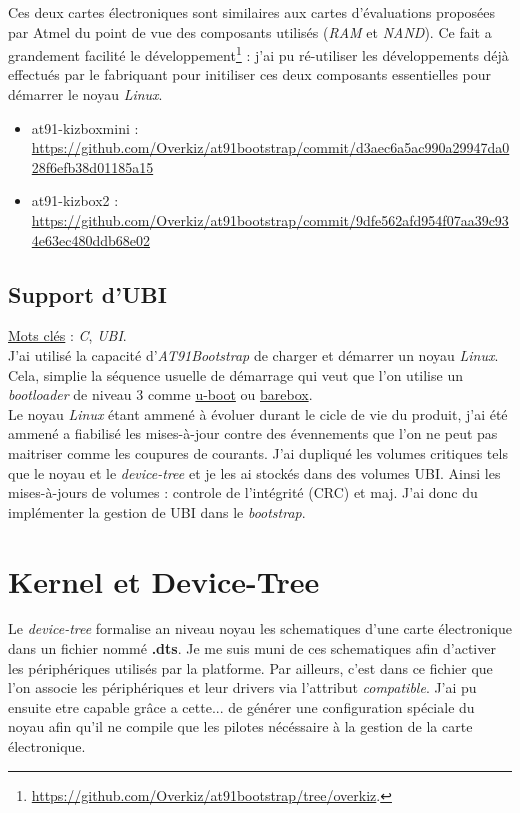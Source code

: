 \documentclass[a4paper]{article}
\begin{document}
Ces deux cartes électroniques sont similaires aux cartes d'évaluations proposées par Atmel du point de vue des composants utilisés (\textit{RAM} et \textit{NAND}). Ce fait a grandement facilité le développement\footnote{\url{https://github.com/Overkiz/at91bootstrap/tree/overkiz}.} : j'ai pu ré-utiliser les développements déjà effectués par le fabriquant pour initiliser ces deux composants essentielles pour démarrer le noyau \textit{Linux}.
\begin{itemize}
\item at91-kizboxmini : \url{https://github.com/Overkiz/at91bootstrap/commit/d3aec6a5ac990a29947da028f6efb38d01185a15}
\item at91-kizbox2 : \url{https://github.com/Overkiz/at91bootstrap/commit/9dfe562afd954f07aa39c934e63ec480ddb68e02}
\end{itemize}

\subsection{Support d'UBI}

\underline{Mots clés} : \textit{C}, \textit{UBI}.\\

J'ai utilisé la capacité d'\textit{AT91Bootstrap} de charger et démarrer un noyau \textit{Linux}. Cela, simplie la séquence usuelle de démarrage qui veut que l'on utilise un \textit{bootloader} de niveau 3 comme \href{http://www.denx.de/wiki/U-Boot}{u-boot} ou \href{http://www.barebox.org/}{barebox}.\\

Le noyau \textit{Linux} étant ammené à évoluer durant le cicle de vie du produit, j'ai été ammené a fiabilisé les mises-à-jour contre des évennements que l'on ne peut pas maitriser comme les coupures de courants. J'ai dupliqué les volumes critiques tels que le noyau et le \textit{device-tree} et je les ai stockés dans des volumes UBI. Ainsi les mises-à-jours de volumes : controle de l'intégrité (CRC) et maj. J'ai donc du implémenter la gestion de UBI dans le \textit{bootstrap}.

\section{Kernel et Device-Tree}

Le \textit{device-tree} formalise an niveau noyau les schematiques d'une carte électronique dans un fichier nommé \textbf{.dts}. Je me suis muni de ces schematiques afin d'activer les périphériques utilisés par la platforme. Par ailleurs, c'est dans ce fichier que l'on associe les périphériques et leur drivers via l'attribut \textit{compatible}. J'ai pu ensuite etre capable grâce a cette... de générer une configuration spéciale du noyau afin qu'il ne compile que les pilotes nécéssaire à la gestion de la carte électronique.
\end{document}
